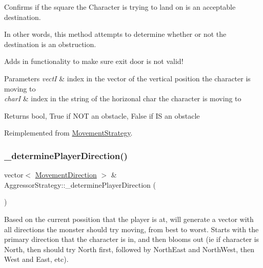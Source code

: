 Confirms if the square the Character is trying to land on is an acceptable destination. 

In other words, this method attempts to determine whether or not the destination is an obstruction. 

Adds in functionality to make sure exit door is not valid! 
\begin{DoxyParams}{Parameters}
{\em vectI} & index in the vector of the vertical position the character is moving to \\
\hline
{\em charI} & index in the string of the horizonal char the character is moving to \\
\hline
\end{DoxyParams}
\begin{DoxyReturn}{Returns}
bool, True if N\+OT an obstacle, False if IS an obstacle 
\end{DoxyReturn}


Reimplemented from \hyperlink{class_movement_strategy_a7767e4732545752f69dab06fe478152c}{Movement\+Strategy}.

\hypertarget{class_aggressor_strategy_a00a432f2a77f2aa0a4b7c2abafd28b53}{}\label{class_aggressor_strategy_a00a432f2a77f2aa0a4b7c2abafd28b53} 
\subsubsection{\texorpdfstring{\+\_\+determine\+Player\+Direction()}{\_determinePlayerDirection()}}
{\footnotesize\ttfamily vector$<$ \hyperlink{_movement_strategy_8h_a0b5e764f0ec9a407e9b8789f0259d754}{Movement\+Direction} $>$ \& Aggressor\+Strategy\+::\+\_\+determine\+Player\+Direction (\begin{DoxyParamCaption}{ }\end{DoxyParamCaption})\hspace{0.3cm}{\ttfamily [protected]}}

Based on the current possition that the player is at, will generate a vector with all directions the monster should try moving, from best to worst. Starts with the \textquotesingle{}primary\textquotesingle{} direction that the character is in, and then blooms out (ie if character is North, then should try North first, followed by North\+East and North\+West, then West and East, etc). \hypertarget{class_aggressor_strategy_a48ef31f068f59cbeef6c949658103ea9}{}\label{class_aggressor_strategy_a48ef31f068f59cbeef6c949658103ea9} 
